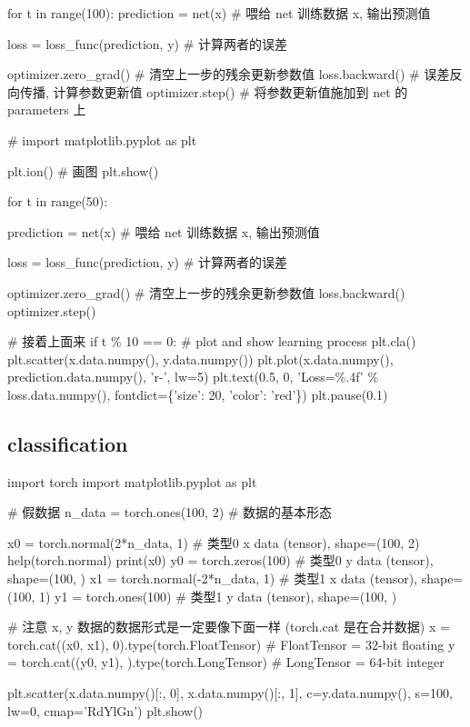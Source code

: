 \documentclass{article}
\begin{document}
\begin{python}
\begin{python}
		for t in range(100):
		prediction = net(x)     \# 喂给 net 训练数据 x, 输出预测值
		
		loss = loss\_func(prediction, y)     \# 计算两者的误差
		
		optimizer.zero\_grad()   \# 清空上一步的残余更新参数值
		loss.backward()         \# 误差反向传播, 计算参数更新值
		optimizer.step()        \# 将参数更新值施加到 net 的 parameters 上
		
		\# import matplotlib.pyplot as plt
		
		plt.ion()   \# 画图
		plt.show()
		
		for t in range(50):
		
		prediction = net(x)  \# 喂给 net 训练数据 x, 输出预测值
		
		loss = loss\_func(prediction, y)  \# 计算两者的误差
		
		optimizer.zero\_grad()  \# 清空上一步的残余更新参数值
		loss.backward()
		optimizer.step()
		
		\# 接着上面来
		if t \% 10 == 0:
		\# plot and show learning process
		plt.cla()
		plt.scatter(x.data.numpy(), y.data.numpy())
		plt.plot(x.data.numpy(), prediction.data.numpy(), 'r-', lw=5)
		plt.text(0.5, 0, 'Loss=\%.4f' \% loss.data.numpy(), fontdict=\{'size': 20, 'color':  'red'\})
		plt.pause(0.1)
	\end{python}
	\subsection{classification}
		\begin{python}
			import torch
			import matplotlib.pyplot as plt
			
			# 假数据
			n_data = torch.ones(100, 2)         # 数据的基本形态
			
			x0 = torch.normal(2*n_data, 1)      # 类型0 x data (tensor), shape=(100, 2)
			help(torch.normal)
			print(x0)
			y0 = torch.zeros(100)               # 类型0 y data (tensor), shape=(100, )
			x1 = torch.normal(-2*n_data, 1)     # 类型1 x data (tensor), shape=(100, 1)
			y1 = torch.ones(100)                # 类型1 y data (tensor), shape=(100, )
			
			# 注意 x, y 数据的数据形式是一定要像下面一样 (torch.cat 是在合并数据)
			x = torch.cat((x0, x1), 0).type(torch.FloatTensor)  # FloatTensor = 32-bit floating
			y = torch.cat((y0, y1), ).type(torch.LongTensor)    # LongTensor = 64-bit integer
			
			plt.scatter(x.data.numpy()[:, 0], x.data.numpy()[:, 1], c=y.data.numpy(), s=100, lw=0, cmap='RdYlGn')
			plt.show()
			

\end{python}
\end{python}
\end{document}
